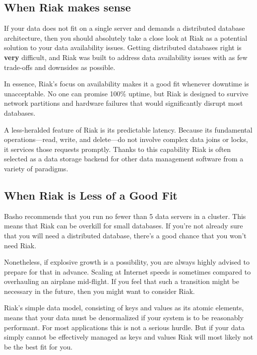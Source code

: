\documentclass[letter]{book}
\newcounter{tab}[chapter]
\begin{document}
\subsection{When Riak makes sense}\label{when-riak-makes-sense}

If your data does not fit on a single server and demands a distributed database architecture, then you should absolutely take a close look at Riak as a potential solution to your data availability issues. Getting distributed databases right is \textbf{very} difficult, and Riak was built to address data availability issues with as few trade-offs and downsides as possible.

In essence, Riak's focus on availability makes it a good fit whenever downtime is unacceptable. No one can promise 100\% uptime, but Riak is designed to survive network partitions and hardware failures that would significantly disrupt most databases.

A less-heralded feature of Riak is its predictable latency. Because its fundamental operations---read, write, and delete---do not involve complex data joins or locks, it services those requests promptly. Thanks to this capability Riak is often selected as a data storage backend for other data management software from a variety of paradigms.

\subsection{When Riak is Less of a Good Fit}\label{when-riak-is-less-of-a-good-fit}

Basho recommends that you run no fewer than 5 data servers in a cluster. This means that Riak can be overkill for small databases. If you're not already sure that you will need a distributed database, there's a good chance that you won't need Riak.

Nonetheless, if explosive growth is a possibility, you are always highly advised to prepare for that in advance. Scaling at Internet speeds is sometimes compared to overhauling an airplane mid-flight. If you feel that such a transition might be necessary in the future, then you might want to consider Riak.

Riak's simple data model, consisting of keys and values as its atomic elements, means that your data must be denormalized if your system is to be reasonably performant. For most applications this is not a serious hurdle. But if your data simply cannot be effectively managed as keys and values Riak will most likely not be the best fit for you.
\end{document}
